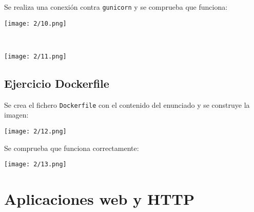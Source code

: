 Se realiza una conexión contra \Verb#gunicorn# y se comprueba que funciona: \\
\begin{minipage}{\linewidth}
	\centering
	\texttt{[image: 2/10.png]}
	\label{fig:2/10}
\end{minipage}
\\
\begin{minipage}{\linewidth}
	\centering
	\texttt{[image: 2/11.png]}
	\label{fig:2/11}
\end{minipage}

\subsection{Ejercicio Dockerfile}
Se crea el fichero \Verb#Dockerfile# con el contenido del enunciado y se construye la
imagen: \\
\begin{minipage}{\linewidth}
	\centering
	\texttt{[image: 2/12.png]}
	\label{fig:2/12}
\end{minipage}

Se comprueba que funciona correctamente: \\
\begin{minipage}{\linewidth}
	\centering
	\texttt{[image: 2/13.png]}
	\label{fig:2/13}
\end{minipage}

\section{Aplicaciones web y HTTP}

